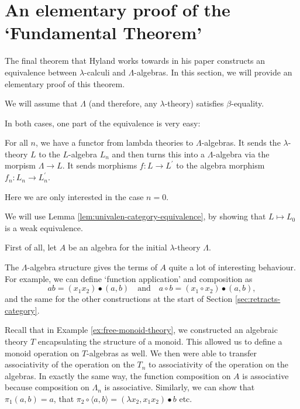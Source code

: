 \section{An elementary proof of the `Fundamental Theorem'}\label{sec:elementary-fundamental-theorem}
The final theorem that Hyland works towards in his paper constructs an equivalence between $ \lambda $-calculi and $ \Lambda $-algebras. In this section, we will provide an elementary proof of this theorem.

We will assume that $ \Lambda $ (and therefore, any $ \lambda $-theory) satisfies $ \beta $-equality.

In both cases, one part of the equivalence is very easy:
\begin{definition}
  For all $ n $, we have a functor from lambda theories to $ \Lambda $-algebras. It sends the $ \lambda $-theory $ L $ to the $ L $-algebra $ L_n $ and then turns this into a $ \Lambda $-algebra via the morpism $ \Lambda \to L $. It sends morphisms $ f: L \to L^\prime $ to the algebra morphism $ f_n : L_n \to L^\prime_n $.
\end{definition}
Here we are only interested in the case $ n = 0 $.

We will use Lemma \ref{lem:univalen-category-equivalence}, by showing that $ L \mapsto L_0 $ is a weak equivalence.

First of all, let $ A $ be an algebra for the initial $ \lambda $-theory $ \Lambda $.

The $ \Lambda $-algebra structure gives the terms of $ A $ quite a lot of interesting behaviour. For example, we can define `function application' and composition as
\[ a b = (x_1 x_2) \bullet (a, b) \quad \text{and} \quad a \circ b = (x_1 \circ x_2) \bullet (a, b), \]
and the same for the other constructions at the start of Section \ref{sec:retracts-category}.

\begin{remark}
  Recall that in Example \ref{ex:free-monoid-theory}, we constructed an algebraic theory $ T $ encapsulating the structure of a monoid. This allowed us to define a monoid operation on $ T $-algebras as well. We then were able to transfer associativity of the operation on the $ T_n $ to associativity of the operation on the algebras. In exactly the same way, the function composition on $ A $ is associative because composition on $ \Lambda_n $ is associative. Similarly, we can show that $ \pi_1 (a, b) = a $, that $ \pi_2 \circ \langle a, b \rangle = (\lambda x_2, x_1 x_2) \bullet b $ etc.
\end{remark}

